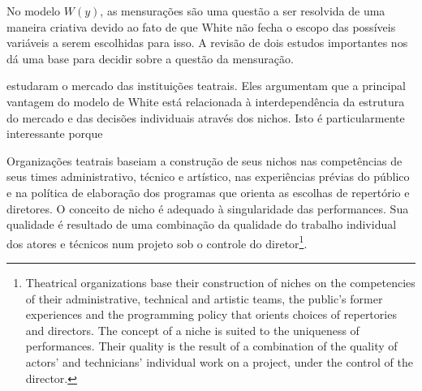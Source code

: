 \documentclass[a4paper, 12pt, openright, oneside, german, french, english, brazil]{abntex2}
\begin{document}
	
	
	No modelo $W(y)$, as mensurações são uma questão a ser resolvida de uma maneira criativa devido ao fato de que White não fecha o escopo das possíveis variáveis a serem escolhidas para isso. A revisão de dois estudos importantes nos dá uma base para decidir sobre a questão da mensuração.
	
	
	 estudaram o mercado das instituições teatrais. Eles argumentam que a principal vantagem do modelo de White está relacionada à interdependência da estrutura do mercado e das decisões individuais através dos nichos. Isto é particularmente interessante porque
	
	\begin{citacao}
		Organizações teatrais baseiam a construção de seus nichos nas competências de seus times administrativo, técnico e artístico, nas experiências prévias do público e na política de elaboração dos programas que orienta as escolhas de repertório e diretores. O conceito de nicho é adequado à singularidade das performances. Sua qualidade é resultado de uma combinação da qualidade do trabalho individual dos atores e técnicos num projeto sob o controle do diretor\footnote{Theatrical organizations base their construction of niches on the competencies of their administrative, technical and artistic teams, the public's former experiences and the programming policy that orients choices of repertories and directors. The concept of a niche is suited to the uniqueness of performances. Their quality is the result of a combination of the quality of actors' and technicians' individual work on a project, under the control of the director.}. \cite[p. 255]{biencourt2002market}
	\end{citacao}
	
\end{document}
